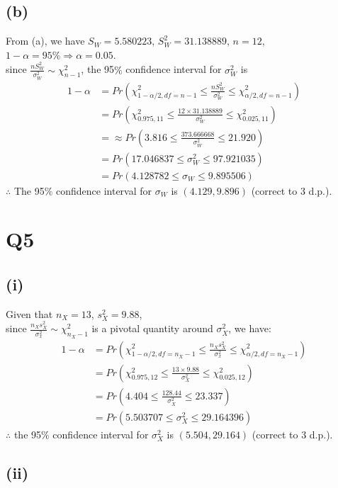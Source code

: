 \documentclass{article}
\begin{document}
\subsection*{(b)}

From (a), we have $S_W = 5.580223$, $S_W^2 = 31.138889$, $n=12$, $1-\alpha=95\% \Rightarrow \alpha = 0.05$. \\
since $\frac{nS_W^2}{\sigma_W^2} \sim \chi^2_{n-1}$, the 95$\%$ confidence interval for $\sigma_W^2$ is
\begin{align*}
1 - \alpha &= Pr(\chi^2_{1-\alpha/2, df=n-1} \leq \frac{nS_W^2}{\sigma_W^2} \leq \chi^2_{\alpha/2, df=n-1}) \\
&= Pr(\chi^2_{0.975, 11} \leq \frac{12 \times 31.138889}{\sigma_W^2} \leq \chi^2_{0.025, 11}) \\
&=\approx Pr(3.816 \leq \frac{373.666668}{\sigma_W^2} \leq 21.920) \\
&= Pr(17.046837 \leq \sigma_W^2 \leq 97.921035) \\
&= Pr(4.128782 \leq \sigma_W \leq 9.895506)
\end{align*}
$\therefore$ The 95$\%$ confidence interval for $\sigma_W$ is $(4.129, 9.896)$ (correct to 3 d.p.).

\section*{Q5}

\subsection*{(i)}

Given that $n_X = 13$, $s_X^2 = 9.88$, \\
since $\frac{n_{X} s_{X}^2}{\sigma_x^2} \sim \chi_{n_X - 1}^2$ is a pivotal quantity around $\sigma_X^2$, we have:
\begin{align*}
1 - \alpha &= Pr(\chi_{1-\alpha/2, df=n_X - 1}^2 \leq \frac{n_{X} s_{X}^2}{\sigma_x^2} \leq \chi_{\alpha/2, df=n_X - 1}^2) \\
&= Pr(\chi_{0.975, 12}^2 \leq \frac{13 \times 9.88}{\sigma_X^2} \leq \chi_{0.025, 12}^2) \\
&= Pr(4.404 \leq \frac{128.44}{\sigma_X^2} \leq 23.337) \\
&= Pr(5.503707 \leq \sigma_X^2 \leq 29.164396)
\end{align*}
$\therefore$ the 95$\%$ confidence interval for $\sigma_X^2$ is $(5.504, 29.164)$ (correct to 3 d.p.).
\subsection*{(ii)}
\end{document}
